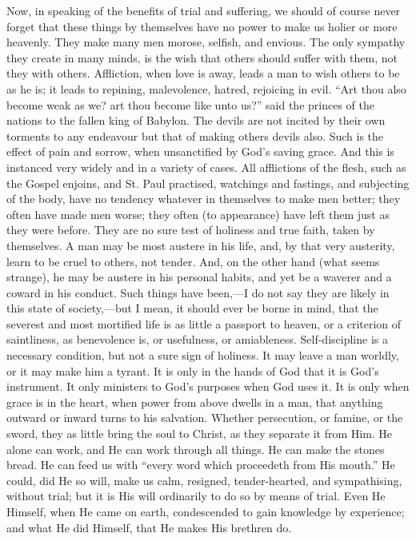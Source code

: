 Now, in speaking of the benefits of trial and suffering, we should
of course never forget that these things by themselves have no power
to make us holier or more heavenly. They make many men morose,
selfish, and envious. The only sympathy they create in many minds, is
the wish that others should suffer with them, not they with others.
Affliction, when love is away, leads a man to wish others to be as he
is; it leads to repining, malevolence, hatred, rejoicing in evil.
``Art thou also become weak as we? art thou become like unto
us?'' said the princes of the nations to the fallen king of
Babylon. The devils are not incited by their own torments to any
endeavour but that of making others devils also. Such is the effect of
pain and sorrow, when unsanctified by God's saving grace. And this is
instanced very widely and in a variety of cases. All afflictions of
the flesh, such as the Gospel enjoins, and St. Paul practised,
watchings and fastings, and subjecting of the body, have no tendency
whatever in themselves to make men better; they often have made men
worse; they often (to appearance) have left them just as they were
before. They are no sure test of holiness and true faith, taken by
themselves. A man may be most austere in his life, and, by that very
austerity, learn to be cruel to others, not tender. And, on the other
hand (what seems strange), he may be austere in his personal habits,
and yet be a waverer and a coward in his conduct. Such things have
been,—I do not say they are likely in this state of society,—but I
mean, it should ever be borne in mind, that the severest and most
mortified life is as little a passport to heaven, or a criterion of
saintliness, as benevolence is, or usefulness, or amiableness.
Self-discipline is a necessary condition, but not a sure sign of
holiness. It may leave a man worldly, or it may make him a tyrant. It
is only in the hands of God that it is God's instrument. It only
ministers to God's purposes when God uses it. It is only when grace is
in the heart, when power from above dwells in a man, that anything
outward or inward turns to his salvation. Whether persecution, or
famine, or the sword, they as little bring the soul to Christ, as they
separate it from Him. He alone can work, and He can work through all
things. He can make the stones bread. He can feed us with ``every
word which proceedeth from His mouth.'' He could, did He so will,
make us calm, resigned, tender-hearted, and sympathising, without
trial; but it is His will ordinarily to do so by means of trial. Even
He Himself, when He came on earth, condescended to gain knowledge by
experience; and what He did Himself, that He makes His brethren do.

